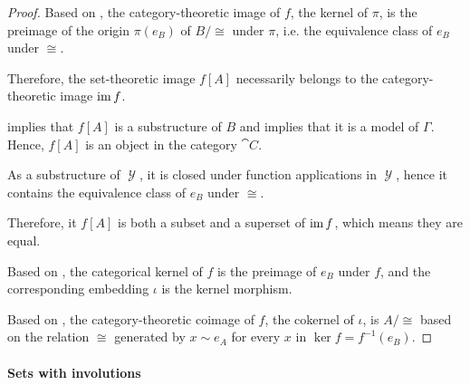 \begin{proof}
  Based on , the category-theoretic image of \( f \), the kernel of \( \pi \), is the preimage of the origin \( \pi(e_B) \) of \( B / {\cong} \) under \( \pi \), i.e. the equivalence class of \( e_B \) under \( {\cong} \).

  Therefore, the set-theoretic image \( f[A] \) necessarily belongs to the category-theoretic image \( \operatorname{im} f \).

   implies that \( f[A] \) is a substructure of \( B \) and  implies that it is a model of \( \Gamma \). Hence, \( f[A] \) is an object in the category \( \cat{C} \).

  As a substructure of \( \mscrY \), it is closed under function applications in \( \mscrY \), hence it contains the equivalence class of \( e_B \) under \( {\cong} \).

  Therefore, it \( f[A] \) is both a subset and a superset of \( \operatorname{im} f \), which means they are equal.

   Based on , the categorical kernel of \( f \) is the preimage of \( e_B \) under \( f \), and the corresponding embedding \( \iota \) is the kernel morphism.

  Based on , the category-theoretic coimage of \( f \), the cokernel of \( \iota \), is \( A / {\cong} \) based on the relation \( {\cong} \) generated by \( x \sim e_A \) for every \( x \) in \( \ker f = f^{-1}(e_B) \).
\end{proof}

\paragraph{Sets with involutions}

